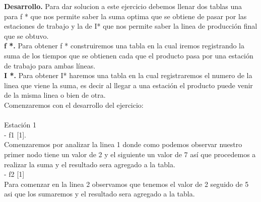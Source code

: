 \documentclass[12pt,twoside]{article}
\begin{document}
\textbf{Desarrollo.}
\newline
Para dar solucion a este ejercicio debemos llenar dos tablas una para f * que nos permite saber la suma optima que se obtiene de pasar por las estaciones de trabajo y la de I* que nos permite saber la linea de producción final que se obtuvo. \\
\textbf{f *.} Para obtener f * construiremos una tabla en la cual iremos registrando la suma de los tiempos que se obtienen cada que el producto pasa por una estación de trabajo para ambas líneas.\\
\textbf{I *.} Para obtener I* haremos una tabla en la cual registraremos el numero de la linea que viene la suma, es decir al llegar a una estación el producto puede venir de la misma linea o bien de otra.\\
Comenzaremos con el desarrollo del ejercicio: \\\\
 Estación 1\\
- f{1} [1]. \\
Comenzaremos por analizar la linea 1 donde como podemos observar nuestro primer nodo tiene un valor de 2 y el siguiente un valor de 7 así que procedemos a realizar la suma y el resultado sera agregado a la tabla.\\
- f{2} [1]\\
Para comenzar en la linea 2 observamos que tenemos el valor de 2 seguido de 5 asi que los sumaremos y el resultado sera agregado a la tabla.
\end{document}

